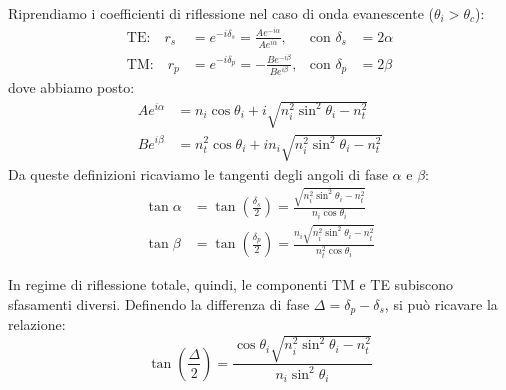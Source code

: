 \documentclass[openany,a4paper,12pt]{book}
\begin{document}
Riprendiamo i coefficienti di riflessione nel caso di onda evanescente ($\theta_i > \theta_c$):
\begin{align*}
    \text{TE:} \quad r_s &= e^{-i\delta_s} = \frac{A e^{-i\alpha}}{A e^{i\alpha}}, & \text{con } \delta_s &= 2\alpha \\
    \text{TM:} \quad r_p &= e^{-i\delta_p} = -\frac{B e^{-i\beta}}{B e^{i\beta}}, & \text{con } \delta_p &= 2\beta 
\end{align*}
dove abbiamo posto:
\begin{align*}
    A e^{i\alpha} &= n_i \cos\theta_i + i \sqrt{n_i^2 \sin^2\theta_i - n_t^2} \\
    B e^{i\beta} &= n_t^2 \cos\theta_i + i n_i \sqrt{n_i^2 \sin^2\theta_i - n_t^2}
\end{align*}
Da queste definizioni ricaviamo le tangenti degli angoli di fase $\alpha$ e $\beta$:
\begin{align*}
    \tan\alpha &= \tan\left(\frac{\delta_s}{2}\right) = \frac{\sqrt{n_i^2 \sin^2\theta_i - n_t^2}}{n_i \cos\theta_i} \\
    \tan\beta &= \tan\left(\frac{\delta_p}{2}\right) = \frac{n_i \sqrt{n_i^2 \sin^2\theta_i - n_t^2}}{n_t^2 \cos\theta_i}
\end{align*}

In regime di riflessione totale, quindi, le componenti TM e TE subiscono sfasamenti diversi. Definendo la differenza di fase $\Delta = \delta_p - \delta_s$, si può ricavare la relazione:
\[
    \tan\left(\frac{\Delta}{2}\right) = \frac{\cos\theta_i \sqrt{n_i^2 \sin^2\theta_i - n_t^2}}{n_i \sin^2\theta_i}
\]
\end{document}
